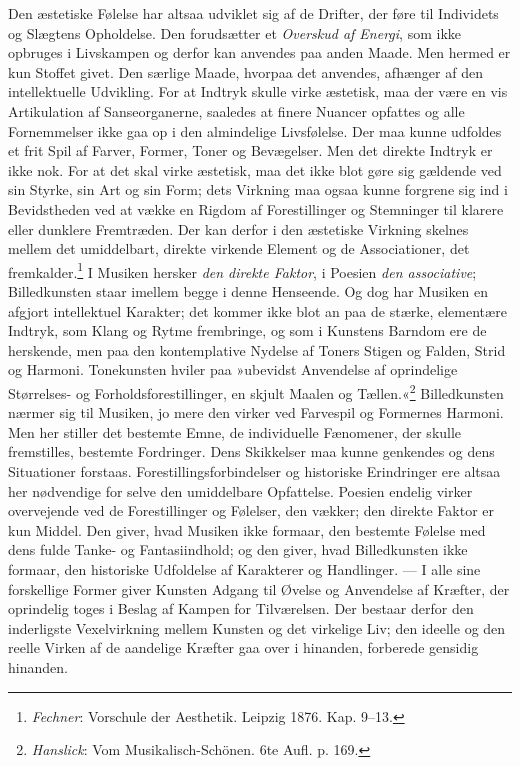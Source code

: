 \documentclass[12pt,a4paper,openany]{book}
\newcommand{\opage}[1]{\marginnote{\footnotesize\textit{[#1]}}}
\begin{document}
Den æstetiske Følelse har altsaa udviklet sig af de Drifter, der føre
til Individets og Slægtens Opholdelse. Den forudsætter et \emph{Overskud
af Energi}, som ikke opbruges i Livskampen og derfor kan anvendes paa
anden Maade. Men hermed er kun Stoffet givet. Den særlige Maade, hvorpaa
det anvendes, afhænger af den intellektuelle Udvikling. For at Indtryk
skulle virke æstetisk, maa der være en vis Artikulation af
Sanseorganerne, saaledes at finere Nuancer opfattes og alle Fornemmelser
ikke gaa op i den almindelige Livsfølelse. Der maa kunne udfoldes et
frit Spil af Farver, Former, Toner og Bevægelser. Men det direkte
Indtryk er ikke nok. For at det skal virke æstetisk, maa det ikke blot
gøre sig gældende ved sin Styrke, sin Art og sin Form; dets Virkning maa
ogsaa kunne forgrene sig ind i Bevidstheden ved at vække en Rigdom af
Forestillinger og Stemninger til klarere eller dunklere Fremtræden. Der
kan derfor i den æstetiske Virkning skelnes mellem det umiddelbart,
direkte virkende Element og de Associationer, det
fremkalder.\footnote[1]{\emph{Fechner}: Vorschule der Aesthetik. Leipzig
1876. Kap. 9--13.} I Musiken hersker \emph{den direkte Faktor}, i Poesien
\emph{den associative}; Billedkunsten staar imellem begge i denne
Henseende. Og dog har Musiken en afgjort intellektuel Karakter; det
kommer ikke blot an paa de stærke, elementære Indtryk, som Klang og
Rytme frembringe, og som i Kunstens Barndom ere de herskende, men paa
den kontemplative Nydelse af Toners Stigen og Falden, Strid og Harmoni.
Tonekunsten hviler paa »ubevidst Anvendelse af oprindelige Størrelses-
og Forholdsforestillinger, en skjult Maalen og
Tællen.«\footnote[2]{\emph{Hanslick}: Vom Musikalisch-Schönen. 6te Aufl.
p. 169.} Billedkunsten nærmer sig til Musiken, jo mere den virker ved
Farvespil og Formernes Harmoni. Men
\opage{317}her stiller det bestemte Emne, de individuelle Fænomener, der
skulle fremstilles, bestemte Fordringer. Dens Skikkelser maa kunne
genkendes og dens Situationer forstaas. Forestillingsforbindelser og
historiske Erindringer ere altsaa her nødvendige for selve den
umiddelbare Opfattelse. Poesien endelig virker overvejende ved de
Forestillinger og Følelser, den vækker; den direkte Faktor er kun
Middel. Den giver, hvad Musiken ikke formaar, den bestemte Følelse med
dens fulde Tanke- og Fantasiindhold; og den giver, hvad Billedkunsten
ikke formaar, den historiske Udfoldelse af Karakterer og Handlinger. ---
I alle sine forskellige Former giver Kunsten Adgang til Øvelse og
Anvendelse af Kræfter, der oprindelig toges i Beslag af Kampen for
Tilværelsen. Der bestaar derfor den inderligste Vexelvirkning mellem
Kunsten og det virkelige Liv; den ideelle og den reelle Virken af de
aandelige Kræfter gaa over i hinanden, forberede gensidig hinanden.
\end{document}
